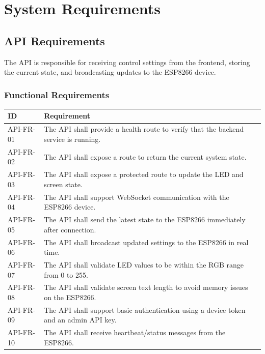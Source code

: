 \documentclass[12pt,a4paper]{report}
\begin{document}
\chapter{System Requirements}

\section{API Requirements}

The API is responsible for receiving control settings from the frontend, storing the current state, and broadcasting updates to the ESP8266 device.

\subsection{Functional Requirements}

\begin{longtable}{p{2.5cm} p{11cm}}
\toprule
\textbf{ID} & \textbf{Requirement} \\
\midrule
API-FR-01 & The API shall provide a health route to verify that the backend service is running. \\
API-FR-02 & The API shall expose a route to return the current system state. \\
API-FR-03 & The API shall expose a protected route to update the LED and screen state. \\
API-FR-04 & The API shall support WebSocket communication with the ESP8266 device. \\
API-FR-05 & The API shall send the latest state to the ESP8266 immediately after connection. \\
API-FR-06 & The API shall broadcast updated settings to the ESP8266 in real time. \\
API-FR-07 & The API shall validate LED values to be within the RGB range from 0 to 255. \\
API-FR-08 & The API shall validate screen text length to avoid memory issues on the ESP8266. \\
API-FR-09 & The API shall support basic authentication using a device token and an admin API key. \\
API-FR-10 & The API shall receive heartbeat/status messages from the ESP8266. \\
\bottomrule
\end{longtable}
\end{document}

